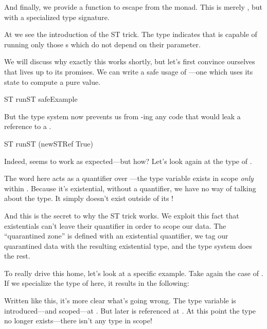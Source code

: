 \documentclass[book.tex]{subfiles}
\begin{document}

And finally, we provide a function to escape from the  monad. This is
merely , but with a specialized type signature.


At  we see the introduction of the ST trick. The type  indicates that  is capable of running only those s
which do not depend on their  parameter.

We will discuss why exactly this works shortly, but let's first convince
ourselves that  lives up to its promises. We can write a safe usage of
---one which uses its state to compute a pure value.


\begin{dorepl}{ST}
runST safeExample
\end{dorepl}

But the type system now prevents us from -ing any code that would leak
a reference to a .

\begin{dorepl}{ST}
runST (newSTRef True)
\end{dorepl}

Indeed,  seems to work as expected---but how? Let's look again at the
type of .


The word  here acts as a quantifier over ---the type variable
exists in scope \emph{only} within . Because it's existential,
without a quantifier, we have no way of talking about the type. It simply
doesn't exist outside of its !

And this is the secret to why the ST trick works. We exploit this fact that
existentials can't leave their quantifier in order to scope our data. The
``quarantined zone'' is defined with an existential quantifier, we tag our
quarantined data with the resulting existential type, and the type system does
the rest.

To really drive this home, let's look at a specific example. Take again the case
of . If we specialize the type of  here, it
results in the following:


Written like this, it's more clear what's going wrong. The type variable 
is introduced---and scoped---at . But later  is referenced at
. At this point the type no longer exists---there isn't any type 
in scope!
\end{document}
